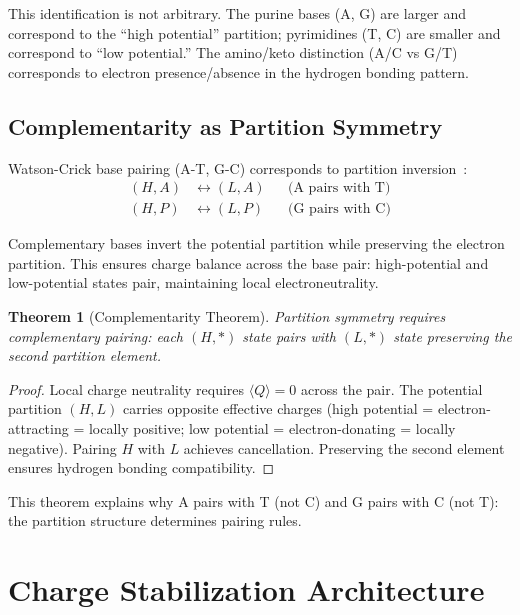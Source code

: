 \documentclass[twocolumn,aps,prb,superscriptaddress,longbibliography,floatfix]{revtex4-2}
\newtheorem{theorem}{Theorem}[section]
\theoremstyle{remark}
\begin{document}
This identification is not arbitrary. The purine bases (A, G) are larger
and correspond to the ``high potential'' partition; pyrimidines (T, C)
are smaller and correspond to ``low potential.'' The amino/keto
distinction (A/C vs G/T) corresponds to electron presence/absence in the
hydrogen bonding pattern.

\subsection{Complementarity as Partition Symmetry}

Watson-Crick base pairing (A-T, G-C) corresponds to partition
inversion~\cite{Watson1953}:
\begin{align}
(H, A) &\leftrightarrow (L, A) && \text{(A pairs with T)} \\
(H, P) &\leftrightarrow (L, P) && \text{(G pairs with C)}
\end{align}

Complementary bases invert the potential partition while preserving the
electron partition. This ensures charge balance across the base pair:
high-potential and low-potential states pair, maintaining local
electroneutrality.

\begin{theorem}[Complementarity Theorem]
\label{thm:complementarity}
Partition symmetry requires complementary pairing: each $(H, *)$ state
pairs with $(L, *)$ state preserving the second partition element.
\end{theorem}

\begin{proof}
Local charge neutrality requires $\langle Q \rangle = 0$ across the
pair. The potential partition $(H, L)$ carries opposite effective
charges (high potential = electron-attracting = locally positive; low
potential = electron-donating = locally negative). Pairing $H$ with $L$
achieves cancellation. Preserving the second element ensures hydrogen
bonding compatibility.
\end{proof}

This theorem explains why A pairs with T (not C) and G pairs with C
(not T): the partition structure determines pairing rules.

\section{Charge Stabilization Architecture}
\label{sec:architecture}
\end{document}
